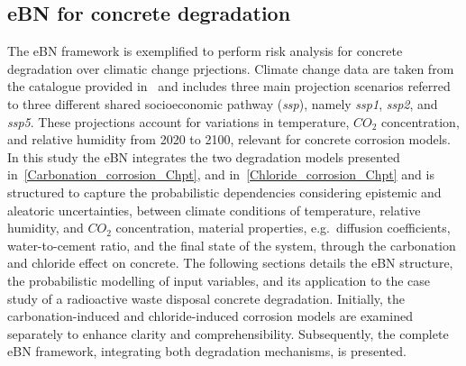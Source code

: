 \subsection{eBN for concrete degradation}
The eBN framework is exemplified to perform risk analysis for concrete degradation over climatic change prjections. Climate change data are taken from the catalogue provided in~\textcite{Copernicus_Climate_Change} and includes three main projection scenarios referred to three different shared socioeconomic pathway (\textit{ssp}), namely \textit{ssp1}, \textit{ssp2}, and \textit{ssp5}. These projections account for variations in temperature, $CO_2$ concentration, and relative humidity from 2020 to 2100, relevant for concrete corrosion models.\\ 
In this study the eBN integrates the two degradation models presented in~\ref{Carbonation_corrosion_Chpt}, and in~\ref{Chloride_corrosion_Chpt} and is structured to capture the probabilistic dependencies considering epistemic and aleatoric uncertainties, between climate conditions of temperature, relative humidity, and $CO_2$ concentration, material properties, e.g.~diffusion coefficients, water-to-cement ratio, and the final state of the system, through the carbonation and chloride effect on concrete.
The following sections details the eBN structure, the probabilistic modelling of input variables, and its application to the case study of a radioactive waste disposal concrete degradation. Initially, the carbonation-induced and chloride-induced corrosion models are examined separately to enhance clarity and comprehensibility. Subsequently, the complete eBN framework, integrating both degradation mechanisms, is presented.

